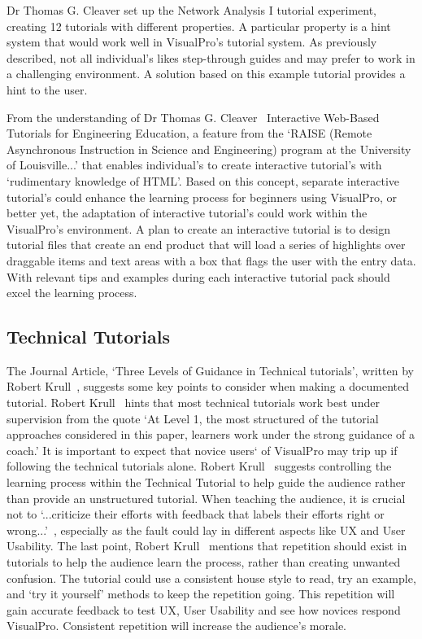 \documentclass[12pt]{report} %
\begin{document}
			Dr Thomas G. Cleaver set up the Network Analysis I tutorial experiment, creating 12 tutorials with different properties. A particular property is a hint system that would work well in VisualPro's tutorial system. As previously described, not all individual's likes step-through guides and may prefer to work in a challenging environment. A solution based on this example tutorial provides a hint to the user.
			
			From the understanding of Dr Thomas G. Cleaver~\cite{cleaver_interactive_1999} Interactive Web-Based Tutorials for Engineering Education, a feature from the `RAISE (Remote Asynchronous Instruction in Science and Engineering) program at the University of Louisville...' that enables individual's to create interactive tutorial's with `rudimentary knowledge of HTML'. Based on this concept, separate interactive tutorial's could enhance the learning process for beginners using VisualPro, or better yet, the adaptation of interactive tutorial's could work within the VisualPro's environment. A plan to create an interactive tutorial is to design tutorial files that create an end product that will load a series of highlights over draggable items and text areas with a box that flags the user with the entry data. With relevant tips and examples during each interactive tutorial pack should excel the learning process.

		\subsection{Technical Tutorials}
			The Journal Article, `Three Levels of Guidance in Technical tutorials', written by Robert Krull~\cite{krull_three_1997}, suggests some key points to consider when making a documented tutorial. Robert Krull~\cite{krull_three_1997} hints that most technical tutorials work best under supervision from the quote `At Level 1, the most structured of the tutorial approaches considered in this paper, learners work under the strong guidance of a coach.' It is important to expect that novice users` of VisualPro may trip up if following the technical tutorials alone. Robert Krull~\cite{krull_three_1997} suggests controlling the learning process within the Technical Tutorial to help guide the audience rather than provide an unstructured tutorial. When teaching the audience, it is crucial not to `...criticize their efforts with feedback that labels their efforts right or wrong...'~\cite{krull_three_1997}, especially as the fault could lay in different aspects like UX and User Usability. The last point, Robert Krull~\cite{krull_three_1997} mentions that repetition should exist in tutorials to help the audience learn the process, rather than creating unwanted confusion. The tutorial could use a consistent house style to read, try an example, and `try it yourself' methods to keep the repetition going. This repetition will gain accurate feedback to test UX, User Usability and see how novices respond VisualPro. Consistent repetition will increase the audience's morale.
\end{document}
